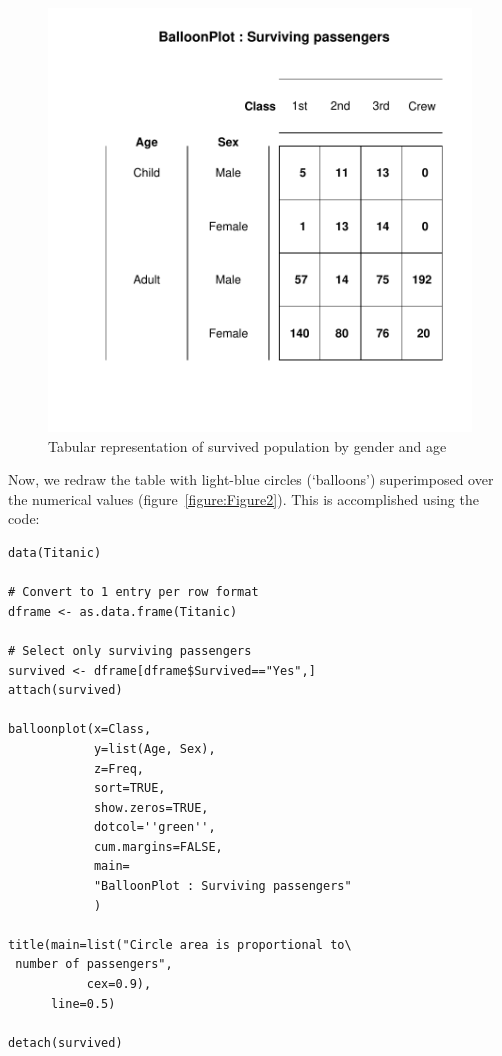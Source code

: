 \documentclass[a4paper]{report}
\begin{document}
\begin{article}
\begin{figure}
\includegraphics[width=\textwidth]{Figure1.pdf}
\caption{\label{figure:Figure1}
Tabular representation of survived population by gender and age}
\end{figure}


Now, we redraw the table with light-blue circles (`balloons')
superimposed over the numerical values (figure~\ref{figure:Figure2}).
This is accomplished using the code:

{\small
\begin{verbatim}
data(Titanic)

# Convert to 1 entry per row format
dframe <- as.data.frame(Titanic) 

# Select only surviving passengers
survived <- dframe[dframe$Survived=="Yes",]
attach(survived)

balloonplot(x=Class,
            y=list(Age, Sex),
            z=Freq,
            sort=TRUE,
            show.zeros=TRUE,
            dotcol=''green'',
            cum.margins=FALSE,
            main=
            "BalloonPlot : Surviving passengers"
            )

title(main=list("Circle area is proportional to\
 number of passengers",
           cex=0.9),
      line=0.5)

detach(survived)
\end{verbatim}
}


\end{article}
\end{document}
